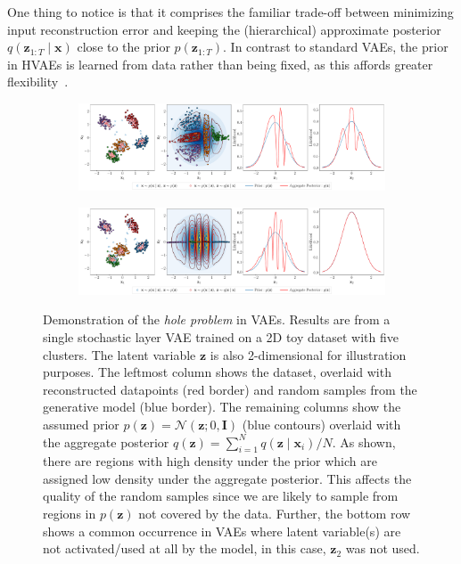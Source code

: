 One thing to notice is that it comprises the familiar trade-off between minimizing input reconstruction error and keeping the (hierarchical) approximate posterior $q(\mathbf{z}_{1:T} \mid \mathbf{x})$ close to the prior $p(\mathbf{z}_{1:T})$. In contrast to standard VAEs, the prior in HVAEs is learned from data rather than being fixed, as this affords greater flexibility~\citep{kingma2016improved,hoffman2016elbo,tomczak2018vae}.

%
\begin{figure}
    \centering
    \begin{subfigure}{\columnwidth}
    \centering  \includegraphics[trim=0 50 0 0, clip, width=\textwidth]{figures/hole2.pdf}
    \end{subfigure}
    \begin{subfigure}{\columnwidth}
    \centering    \includegraphics[width=\textwidth]{figures/hole.pdf}
    \end{subfigure}
    \caption{Demonstration of the \textit{hole problem} in VAEs. Results are from a single stochastic layer VAE trained on a 2D toy dataset with five clusters. The latent variable $\mathbf{z}$ is also 2-dimensional for illustration purposes.
    The leftmost column shows the dataset, overlaid with reconstructed datapoints (red border) and random samples from the generative model (blue border). The remaining columns show the assumed prior $p(\mathbf{z}) = \mathcal{N}(\mathbf{z};0, \mathbf{I})$ (blue contours) overlaid with the aggregate posterior $q(\mathbf{z}) = \sum_{i=1}^N q(\mathbf{z} \mid \mathbf{x}_i) / N$. As shown, there are regions with high density under the prior which are assigned low density under the aggregate posterior. This affects the quality of the random samples since we are likely to sample from regions in $p(\mathbf{z})$ not covered by the data. Further, the bottom row shows a common occurrence in VAEs where latent variable(s) are not activated/used at all by the model, in this case, $\mathbf{z}_2$ was not used.
    }
    \label{fig: hole}
\end{figure}
%
